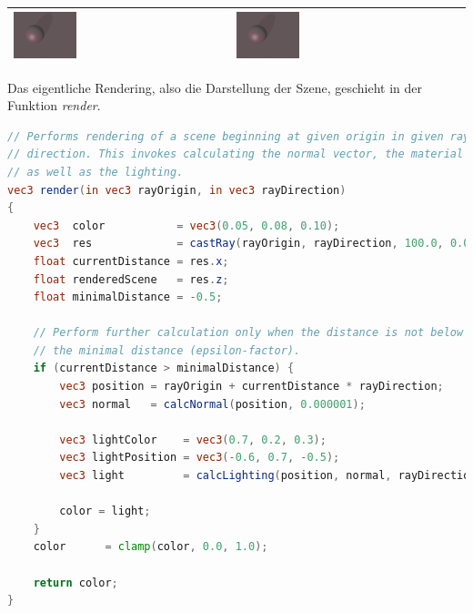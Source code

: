 \begin{table}[H]
\begin{tabular}{p{}p{}p{}}
            \includegraphics[width=0.3\textwidth]{img/sphere_tracing_shadows_128.png} \newline &
            \includegraphics[width=0.3\textwidth]{img/sphere_tracing_shadows_256.png} \newline \\
        \bottomrule
    \end{tabular}
\end{table}

Das eigentliche Rendering, also die Darstellung der Szene, geschieht in
der Funktion \textit{render}.

\begin{lstlisting}[language=GLSL,caption={Funktion zur Darstellung der
        Szene in
        GLSL. Die Szene bzw.\ der Farbwert wird nur dann zurückgegeben
        bzw.\ berechnet, wenn eine minimale Distanz nicht unterschritten
        wird.},label={alg:glsl_render},captionpos=b,emph={render}]
// Performs rendering of a scene beginning at given origin in given ray
// direction. This invokes calculating the normal vector, the material
// as well as the lighting.
vec3 render(in vec3 rayOrigin, in vec3 rayDirection)
{
    vec3  color           = vec3(0.05, 0.08, 0.10);
    vec3  res             = castRay(rayOrigin, rayDirection, 100.0, 0.00001, 100);
    float currentDistance = res.x;
    float renderedScene   = res.z;
    float minimalDistance = -0.5;

    // Perform further calculation only when the distance is not below
    // the minimal distance (epsilon-factor).
    if (currentDistance > minimalDistance) {
        vec3 position = rayOrigin + currentDistance * rayDirection;
        vec3 normal   = calcNormal(position, 0.000001);

        vec3 lightColor    = vec3(0.7, 0.2, 0.3);
        vec3 lightPosition = vec3(-0.6, 0.7, -0.5);
        vec3 light         = calcLighting(position, normal, rayDirection, material, lightPosition, lightColor);

        color = light;
    }
    color      = clamp(color, 0.0, 1.0);

    return color;
}
\end{lstlisting}

